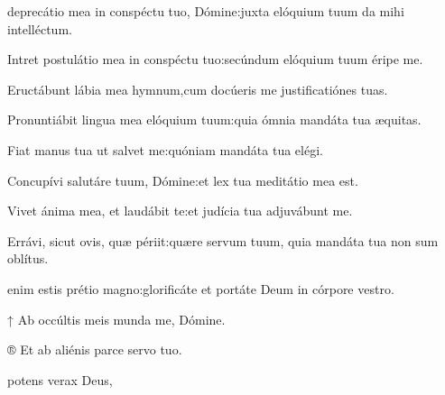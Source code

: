\begin{multicols}{2}

\Normal

\vspace{-0.2cm}

 deprecátio mea in conspéctu tuo, Dómine\thinspace:\GreStarNbsp juxta elóquium tuum da mihi intelléctum.

Intret postulátio mea in conspéctu tuo\thinspace:\GreStarNbsp secúndum elóquium tuum éripe me.

Eructábunt lábia mea hymnum,\GreStarNbsp cum docúeris me justificatiónes tuas.

Pronuntiábit lingua mea elóquium tuum\thinspace:\GreStarNbsp quia ómnia mandáta tua æquitas.

Fiat manus tua ut salvet me\thinspace:\GreStarNbsp quóniam mandáta tua elégi.

Concupívi salutáre tuum, Dómine\thinspace:\GreStarNbsp et lex tua meditátio mea est.

Vivet ánima mea, et laudábit te\thinspace:\GreStarNbsp et judícia tua adjuvábunt me.

Errávi, sicut ovis, quæ périit\thinspace:\GreStarNbsp quære servum tuum, quia mandáta tua non sum oblítus.

\vspace{-0.4cm}


\vspace{-0.4cm}


 enim estis prétio magno\thinspace:\GreStarNbsp glo\-rificáte et portáte Deum in córpore vestro.

↑ Ab occúltis meis munda me, Dómine.

® Et ab aliénis parce servo tuo.



\Ligne


\vspace{-0.4cm}


\Hymne{}

\setlength{\leftskip}{0cm}
 potens verax Deus,


\end{multicols}
